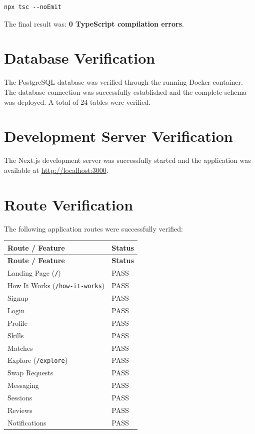 \documentclass[12pt,a4paper]{report}
\begin{document}
\begin{lstlisting}
npx tsc --noEmit
\end{lstlisting}

The final result was: \textbf{0 TypeScript compilation errors}.

\section{Database Verification}
The PostgreSQL database was verified through the running Docker container.  The
database connection was successfully established and the complete schema was
deployed.  A total of 24 tables were verified.

\section{Development Server Verification}
The Next.js development server was successfully started and the application was
available at \url{http://localhost:3000}.

\section{Route Verification}
The following application routes were successfully verified:

\begin{longtable}{@{} l l @{}}
\toprule
\textbf{Route / Feature} & \textbf{Status} \\
\midrule
\endfirsthead
\toprule
\textbf{Route / Feature} & \textbf{Status} \\
\midrule
\endhead
Landing Page (\texttt{/})             & PASS \\
How It Works (\texttt{/how-it-works}) & PASS \\
Signup                               & PASS \\
Login                                & PASS \\
Profile                              & PASS \\
Skills                               & PASS \\
Matches                              & PASS \\
Explore (\texttt{/explore})           & PASS \\
Swap Requests                        & PASS \\
Messaging                            & PASS \\
Sessions                             & PASS \\
Reviews                              & PASS \\
Notifications                        & PASS \\
\bottomrule
\end{longtable}
\end{document}
